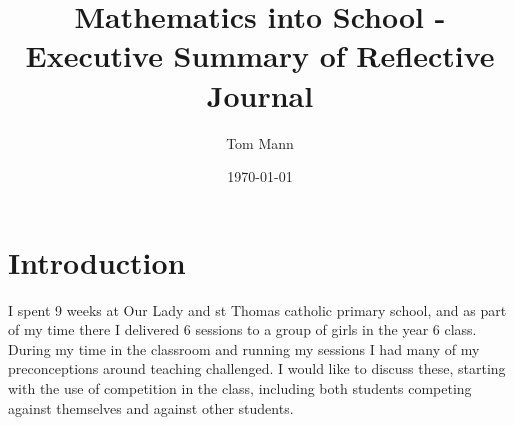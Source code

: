 \documentclass[11pt, a4paper, notitlepage]{article}
\title{Mathematics into School - Executive Summary of Reflective Journal}
\author{Tom Mann}
\date{\today}
\begin{document}
\maketitle

\section*{Introduction}
I spent 9 weeks at Our Lady and st Thomas catholic primary school, and as part of my time there I delivered 6 sessions to a group of girls in the year 6 class. During my time in the classroom and running my sessions I had many of my preconceptions around teaching challenged. I would like to discuss these, starting with the use of competition in the class, including both students competing against themselves and against other students.
\end{document}
